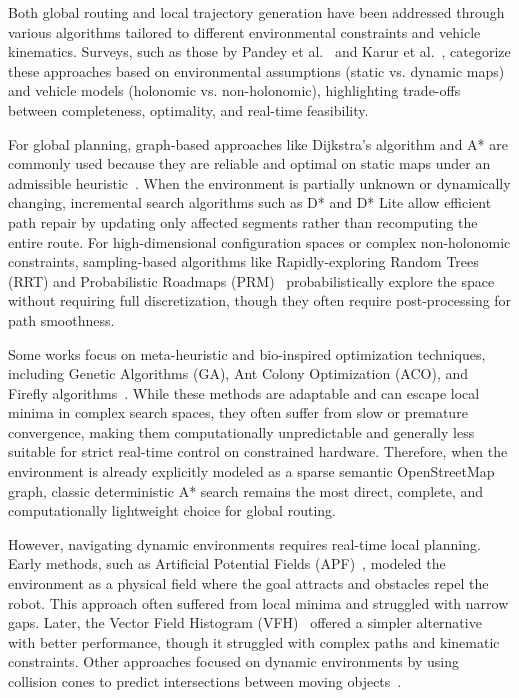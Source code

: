 Both global routing and local trajectory generation have been addressed through various algorithms tailored to different environmental constraints and vehicle kinematics. Surveys, such as those by Pandey et al.~\cite{pandey2017review} and Karur et al.~\cite{karur2021survey}, categorize these approaches based on environmental assumptions (static vs. dynamic maps) and vehicle models (holonomic vs. non-holonomic), highlighting trade-offs between completeness, optimality, and real-time feasibility.

For global planning, graph-based approaches like Dijkstra's algorithm and A* are commonly used because they are reliable and optimal on static maps under an admissible heuristic~\cite{karur2021survey}. When the environment is partially unknown or dynamically changing, incremental search algorithms such as D* and D* Lite allow efficient path repair by updating only affected segments rather than recomputing the entire route. For high-dimensional configuration spaces or complex non-holonomic constraints, sampling-based algorithms like Rapidly-exploring Random Trees (RRT) and Probabilistic Roadmaps (PRM)~\cite{lavalle2006planning} probabilistically explore the space without requiring full discretization, though they often require post-processing for path smoothness.

Some works focus on meta-heuristic and bio-inspired optimization techniques, including Genetic Algorithms (GA), Ant Colony Optimization (ACO), and Firefly algorithms~\cite{karur2021survey}. While these methods are adaptable and can escape local minima in complex search spaces, they often suffer from slow or premature convergence, making them computationally unpredictable and generally less suitable for strict real-time control on constrained hardware. Therefore, when the environment is already explicitly modeled as a sparse semantic OpenStreetMap graph, classic deterministic A* search remains the most direct, complete, and computationally lightweight choice for global routing.

However, navigating dynamic environments requires real-time local planning. Early methods, such as Artificial Potential Fields (APF)~\cite{khatib1986potential}, modeled the environment as a physical field where the goal attracts and obstacles repel the robot. This approach often suffered from local minima and struggled with narrow gaps. Later, the Vector Field Histogram (VFH)~\cite{borenstein1989vfh} offered a simpler alternative with better performance, though it struggled with complex paths and kinematic constraints. Other approaches focused on dynamic environments by using collision cones to predict intersections between moving objects~\cite{chakravarthy2002collision}.

